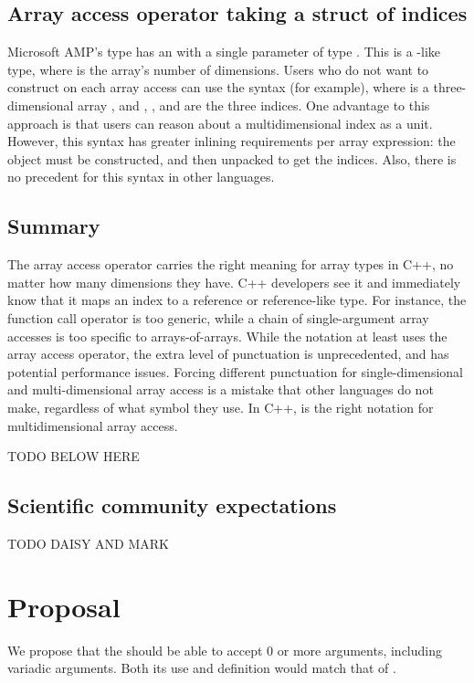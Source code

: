 \documentclass{wg21}
\begin{document}
\subsection{Array access operator taking a struct of indices}

Microsoft AMP's  type has an  with a single parameter of type .  This is a -like type, where  is the array's number of dimensions.  Users who do not want to construct  on each array access can use the syntax  (for example), where  is a three-dimensional array , and , , and  are the three indices.  One advantage to this approach is that users can reason about a multidimensional index as a unit.  However, this syntax has greater inlining requirements per array expression: the  object must be constructed, and then unpacked to get the indices.  Also, there is no precedent for this  syntax in other languages.

\subsection{Summary}

The array access operator carries the right meaning for array types in C++, no matter how many dimensions they have.  C++ developers see it and immediately know that it maps an index to a reference or reference-like type.  For instance, the function call operator is too generic, while a chain of single-argument array accesses is too specific to arrays-of-arrays.  While the notation  at least uses the array access operator, the extra level of punctuation is unprecedented, and has potential performance issues.  Forcing different punctuation for single-dimensional and multi-dimensional array access is a mistake that other languages do not make, regardless of what symbol they use.  In C++,  is the right notation for multidimensional array access.

TODO BELOW HERE

\subsection{Scientific community expectations}

TODO DAISY AND MARK

\section{Proposal}
We propose that the  should be able to accept 0 or more arguments, including variadic arguments.
Both its use and definition would match that of .
\end{document}
